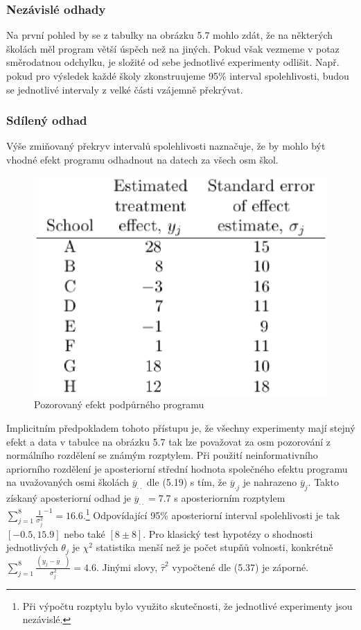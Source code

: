 \subsubsection{Nezávislé odhady}

Na první pohled by se z tabulky na obrázku 5.7 mohlo zdát, že na některých školách měl program větší úspěch než na jiných. Pokud však vezmeme v potaz směrodatnou odchylku, je složité od sebe jednotlivé experimenty odlišit. Např. pokud pro výsledek každé školy zkonstruujeme 95\% interval spolehlivosti, budou se jednotlivé intervaly z velké části vzájemně překrývat.

\subsubsection{Sdílený odhad}

Výše zmiňovaný překryv intervalů spolehlivosti naznačuje, že by mohlo být vhodné efekt programu odhadnout na datech za všech osm škol.
\begin{figure}[htp]
\centering
\includegraphics[scale = 0.45]{pictures/tbl_5_3.eps}
\caption{Pozorovaný efekt podpůrného programu}
\label{tbl_5_3}
\end{figure}
Implicitním předpokladem tohoto přístupu je, že všechny experimenty mají stejný efekt a data v tabulce na obrázku 5.7 tak lze považovat za osm pozorování z normálního rozdělení se známým rozptylem. Při použití neinformativního apriorního rozdělení je aposteriorní střední hodnota společného efektu programu na uvažovaných osmi školách $\overline{y}_{\cdot \cdot}$ dle (5.19) s tím, že $\overline{y}_{\cdot j}$ je nahrazeno $\overline{y}_j$. Takto získaný aposteriorní odhad je $\overline{y}_{\cdot \cdot} = 7.7$ s aposteriorním rozptylem $\sum_{j = 1}^8 \frac{1}{\sigma_j^2}^{-1} = 16.6$.\footnote{Při výpočtu rozptylu bylo využito skutečnosti, že jednotlivé experimenty jsou nezávislé.} Odpovídající 95\% aposteriorní interval spolehlivosti je tak $[-0.5, 15.9]$ nebo také $[8 \pm 8]$. Pro klasický test hypotézy o shodnosti jednotlivých $\theta_j$ je $\chi^2$ statistika menší než je počet stupňů volnosti, konkrétně $\sum_{j = 1}^8 \frac{(y_j - \overline{y}_{\cdot \cdot})}{\sigma_j^2} = 4.6$. Jinými slovy, $\hat{\tau}^2$ vypočtené dle (5.37) je záporné.

